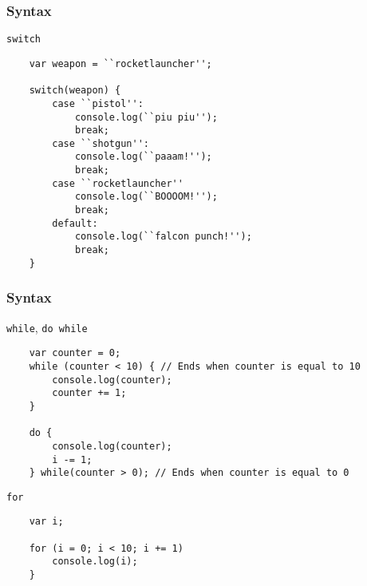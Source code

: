 \begin{frame}[fragile]
  \frametitle{Syntax}

  \begin{block}{\texttt{switch}}
    \scriptsize{
    \begin{verbatim}
    var weapon = ``rocketlauncher'';

    switch(weapon) {
        case ``pistol'':
            console.log(``piu piu'');
            break;
        case ``shotgun'':
            console.log(``paaam!'');
            break;
        case ``rocketlauncher''
            console.log(``BOOOOM!'');
            break;
        default:
            console.log(``falcon punch!'');
            break;
    }
    \end{verbatim}
    }
  \end{block}
\end{frame}

\begin{frame}[fragile]
  \frametitle{Syntax}

  \begin{block}{\texttt{while}, \texttt{do while}}
    \scriptsize{
    \begin{verbatim}
    var counter = 0;
    while (counter < 10) { // Ends when counter is equal to 10
        console.log(counter);
        counter += 1;
    }

    do {
        console.log(counter);
        i -= 1;
    } while(counter > 0); // Ends when counter is equal to 0
    \end{verbatim}
    }
  \end{block}

  \pause

  \begin{block}{\texttt{for}}
    {\scriptsize
    \begin{verbatim}
    var i;

    for (i = 0; i < 10; i += 1)
        console.log(i);
    }
    \end{verbatim}
    }
  \end{block}
\end{frame}

